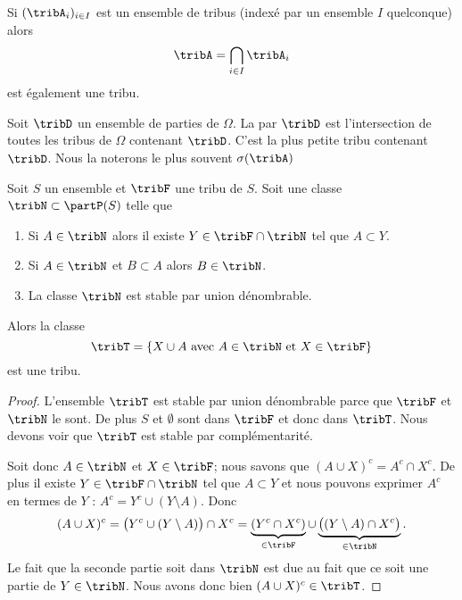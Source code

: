 Si \( (\tribA_i)_{i\in I}\) est un ensemble de tribus (indexé par un ensemble \( I\) quelconque) alors 
\begin{equation}
    \tribA=\bigcap_{i\in I}\tribA_i
\end{equation}
est également une tribu.

\begin{definition}
    Soit \( \tribD\) un ensemble de parties de \( \Omega\). La  par \( \tribD\) est l'intersection de toutes les tribus de \( \Omega\) contenant \( \tribD\). C'est la plus petite tribu contenant \( \tribD\). Nous la noterons le plus souvent \( \sigma(\tribA)\)
\end{definition}

\begin{proposition}  \label{PropHYLooLgOCy}
    Soit \( S\) un ensemble et \( \tribF\) une tribu de \( S\). Soit une classe \( \tribN\subset\partP(S)\) telle que
    \begin{enumerate}
        \item
            Si \( A\in\tribN\) alors il existe \( Y\in\tribF\cap\tribN\) tel que \( A\subset Y\).
        \item
            Si \( A\in\tribN\) et \( B\subset A\) alors \( B\in\tribN\).
        \item
            La classe \( \tribN\) est stable par union dénombrable.
    \end{enumerate}
    Alors la classe
    \begin{equation}
        \tribT=\{ X\cup A\text{ avec \( A\in\tribN\) et \( X\in\tribF\)} \}
    \end{equation}
    est une tribu.
\end{proposition}

\begin{proof}
    L'ensemble \( \tribT\) est stable par union dénombrable parce que \( \tribF\) et \( \tribN\) le sont. De plus \( S\) et \( \emptyset\) sont dans \( \tribF\) et donc dans \( \tribT\). Nous devons voir que \( \tribT\) est stable par complémentarité.

    Soit donc \( A\in\tribN\) et \( X\in\tribF\); nous savons que \( (A\cup X)^c=A^c\cap X^c\). De plus il existe \( Y\in\tribF\cap\tribN\) tel que \( A\subset Y\) et nous pouvons exprimer \( A^c\) en termes de \( Y\) : \( A^c=Y^c\cup(Y\setminus A)\). Donc
    \begin{equation}
        (A\cup X)^c=\big( Y^c\cup(Y\setminus A) \big)\cap X^c=\underbrace{(Y^c\cap X^c)}_{\in\tribF}\cup\underbrace{\big( (Y\setminus A)\cap X^c \big)}_{\in\tribN}.
    \end{equation}
    Le fait que la seconde partie soit dans \( \tribN\) est due au fait que ce soit une partie de \( Y\in\tribN\). Nous avons donc bien \( (A\cup X)^c\in\tribT\).
\end{proof}

